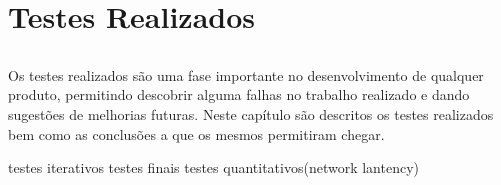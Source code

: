 \chapter{Testes Realizados} \label{chap:testes}

\section*{}

Os testes realizados são uma fase importante no desenvolvimento de qualquer produto, permitindo descobrir alguma falhas no trabalho realizado e dando sugestões de melhorias futuras.
Neste capítulo são descritos os testes realizados bem como as conclusões a que os mesmos permitiram chegar.

testes iterativos
testes finais
testes quantitativos(network lantency)

